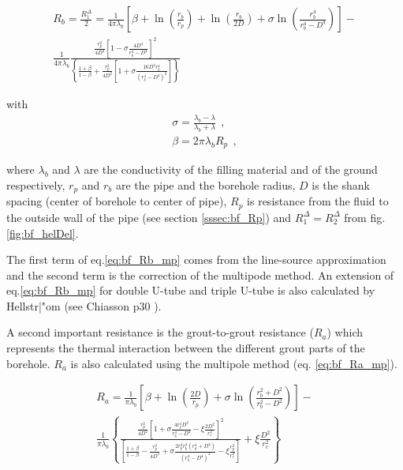 \documentclass[a4paper,oneside,11pt]{report}
\begin{document}
\begin{multline}  \label{eq:bf_Rb_mp}
	R_b = \frac{R_1^\Delta}{2} = \frac{1}{4 \pi \lambda_b} \left[ \beta + \ln\left(\frac{r_b}{r_p}\right) + \ln\left(\frac{r_b}{2D}\right) + \sigma \ln\left(\frac{r_b^4}{r_b^4-D^4}\right) \right] - 
	\\
	\frac{1}{4 \pi \lambda_b} \frac{ 
			\frac{r_p^2}{4 D^2} \left[ 1 - \sigma \frac{4 D^4}{r_b^4 - D^4} \right]^2
			}
			{ 	\left\{
			\frac{1 + \beta}{1 - \beta} + \frac{r_p^2}{4 D^2} \left[ 1 + \sigma \frac{16 D^4 r_b^4}{(r_b^4 - D^4)^2} \right] 	  				\right\}
			}
\end{multline}

with
\begin{align*}
	\sigma = \frac{\lambda_b - \lambda}{\lambda_b + \lambda} \ \ , \\
	\beta = 2 \pi \lambda_b R_p \ \ ,
\end{align*}

where $\lambda_b$ and $\lambda$ are the conductivity of the filling material and of the ground respectively, $r_p$ and $r_b$ are the pipe and the borehole radius, $D$ is the shank spacing (center of borehole to center of pipe), $R_p$ is resistance from the fluid to the outside wall of the pipe (see section \ref{sssec:bf_Rp})  and $R_1^\Delta = R_2^\Delta$ from fig.\ref{fig:bf_helDel}.


The first term of eq.\ref{eq:bf_Rb_mp} comes from the line-source approximation and the second term is the correction of the multipode method. An extension of eq.\ref{eq:bf_Rb_mp} for double U-tube and triple U-tube is also calculated by Hellstr|"om (see Chiasson p30 \cite{chi07}).

A second important resistance is the grout-to-grout resistance ($R_a$) which represents the thermal interaction between the different grout parts of the borehole. $R_a$ is also calculated using the multipole method (eq. \ref{eq:bf_Ra_mp}).

\begin{multline} \label{eq:bf_Ra_mp}
	R_a = \frac{1}{\pi \lambda_b} \left[ 
				\beta + \ln\left( \frac{2D}{r_p} \right) + \sigma \ln\left( \frac{r_b^2 + D^2}{r_b^2 - D^2} \right) 
								 \right] - \\
		\frac{1}{\pi \lambda_b} \left\{ 
				\frac{
					\frac{r_p^2}{4D^2} \left[ 1 + \sigma \frac{4 r_b^4 D^2}{r_b^4 - D^4} - \xi \frac{2 D^2}{r_c^2} \right]^2}
					{ 
					\left[ \frac{1 + \beta}{1 - \beta} - \frac{r_p^2}{4 D^2} + 
							\sigma \frac{2 r_p^2 r_b^2 (r_b^4 + D^4)}{(r_b^4 - D^4)^2} 
							- \xi \frac{r_p^2}{r_c^2} 
					\right] 
					} + 
					\xi \frac{D^2}{r_c^2}  
								\right\}
\end{multline}
\end{document}

